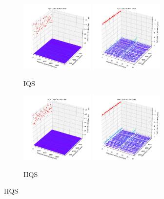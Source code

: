 \begin{figure}
    \centering
    \begin{subfigure}[b]{\textwidth}
        \centering
        \includegraphics[width=0.40\textwidth]{./fragments/04_experimental_execution/images/01_basebenchmark_05_classes.png.1_0.png}
        \includegraphics[width=0.40\textwidth]{./fragments/04_experimental_execution/images/01_basebenchmark_05_classes.png.1_1.png}
        \caption{IQS}
        \label{FIG:BENCHMARK_05_CLASSES__0_0}
    \end{subfigure}

    \begin{subfigure}[b]{\textwidth}
        \centering
        \includegraphics[width=0.40\textwidth]{./fragments/04_experimental_execution/images/01_basebenchmark_05_classes.png.0_1.png}
        \includegraphics[width=0.40\textwidth]{./fragments/04_experimental_execution/images/01_basebenchmark_05_classes.png.0_2.png}
        \caption{IIQS}
        \label{FIG:BENCHMARK_05_CLASSES__0_1}
    \end{subfigure}


\end{figure}
